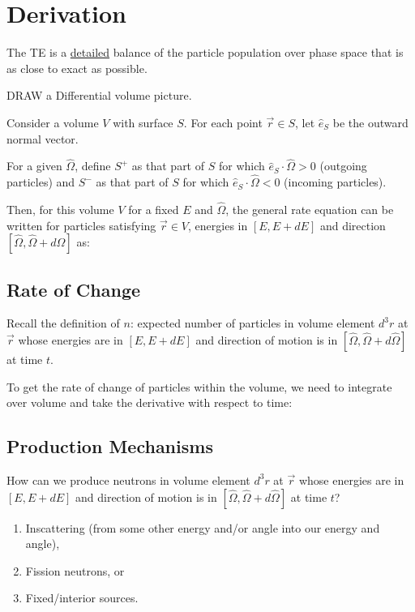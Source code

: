 \documentclass[12pt]{article}
\newif\ifeqns
\newcommand{\vOmega}{\ensuremath{\hat{\Omega}}}
\begin{document}
\section*{Derivation}
The TE is a \underline{detailed} balance of the particle population over phase space that is as close to exact as possible. 

DRAW a Differential volume picture.

Consider a volume $V$ with surface $S$. For each point $\vec{r} \in S$, let $\hat{e}_S$ be the outward normal vector.

For a given $\vOmega$, define $S^+$ as that part of $S$ for which $\hat{e}_S \cdot \vOmega > 0$ (outgoing particles) and $S^-$ as that part of $S$ for which $\hat{e}_S \cdot \vOmega < 0$ (incoming particles).

Then, for this volume $V$ for a fixed $E$ and $\vOmega$, the general rate equation can be written for particles satisfying $\vec{r} \in V$, energies in $[E, E+dE]$ and direction $[\vOmega, \vOmega + d\vOmega]$ as:

\hspace*{3 em} 

\subsection*{Rate of Change}
Recall the definition of $n$: expected number of particles in volume element $d^3r$ at $\vec{r}$ whose energies are in $[E, E + dE]$ and direction of motion is in $[\vOmega, \vOmega + d\vOmega]$ at time $t$.

To get the rate of change of particles within the volume, we need to integrate over volume and take the derivative with respect to time:
%
\ifeqns
\[\boxed{\Bigl[ \int_V \frac{\partial}{\partial t} n(\vec{r}, E, \vOmega, t) d\vec{r} \Bigr] dE d\vOmega }\]
\else
\vspace*{2.5em}
\fi

\subsection*{Production Mechanisms}
How can we produce neutrons in volume element $d^3r$ at $\vec{r}$ whose energies are in $[E, E + dE]$ and direction of motion is in $[\vOmega, \vOmega + d\vOmega]$ at time $t$?
%
\begin{enumerate}
\item Inscattering (from some other energy and/or angle into our energy and angle),
\item Fission neutrons, or
\item Fixed/interior sources.
\end{enumerate}
\end{document}
